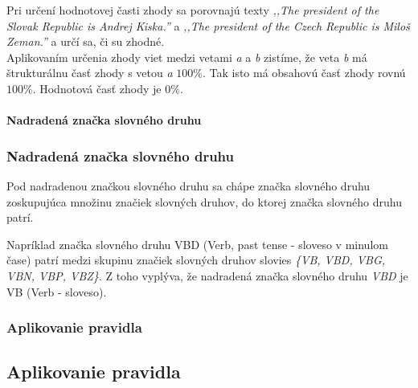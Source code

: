 Pri určení hodnotovej časti zhody sa porovnajú texty \textit{,,The president of the Slovak Republic is Andrej Kiska.''} a \textit{,,The president of the Czech Republic is Miloš Zeman.''} a určí sa, či su zhodné. \\

Aplikovaním určenia zhody viet medzi vetami \textit{a} a \textit{b} zistíme, že veta \textit{b} má štrukturálnu časť zhody s vetou \textit{a} $100\%$. Tak isto má obsahovú časť zhody rovnú $100\%$. Hodnotová časť zhody je $0\%$.

%
%
{
	\paragraph{Nadradená značka slovného druhu}
}
{
	\subsubsection{Nadradená značka slovného druhu}
}
\label{paragraph:superior_pos_tag}

Pod nadradenou značkou slovného druhu sa chápe značka slovného druhu zoskupujúca množinu značiek slovných druhov, do ktorej značka slovného druhu patrí. 

Napríklad značka slovného druhu VBD (Verb, past tense - sloveso v minulom čase) patrí medzi skupinu značiek slovných druhov slovies \textit{\{VB, VBD, VBG, VBN, VBP, VBZ\}}. Z toho vyplýva, že nadradená značka slovného druhu \textit{VBD} je VB (Verb - sloveso).

%
%
{
	\subsubsection{Aplikovanie pravidla}
}
{
	\subsection{Aplikovanie pravidla}
}
\label{subsubsection:rule_application}

